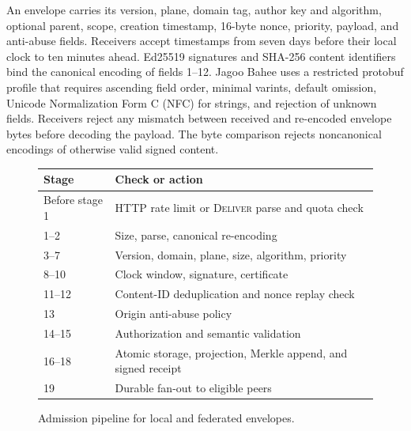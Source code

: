 \documentclass[conference,a4paper,10pt]{IEEEtran}
\begin{document}
An envelope carries its version, plane, domain tag, author key and algorithm, optional parent, scope, creation timestamp, 16-byte nonce, priority, payload, and anti-abuse fields. Receivers accept timestamps from seven days before their local clock to ten minutes ahead. Ed25519 signatures \cite{bernstein2012ed25519} and SHA-256 content identifiers bind the canonical encoding of fields 1--12. Jagoo Bahee uses a restricted protobuf profile \cite{protobufnotcanonical} that requires ascending field order, minimal varints, default omission, Unicode Normalization Form C (NFC) for strings, and rejection of unknown fields. Receivers reject any mismatch between received and re-encoded envelope bytes before decoding the payload. The byte comparison rejects noncanonical encodings of otherwise valid signed content.

\begin{figure}[!t]
  \centering
  {\footnotesize
  \begin{tabularx}{\columnwidth}{@{}lX@{}}
    \toprule
    \textbf{Stage} & \textbf{Check or action} \\
    \midrule
    Before stage 1 & HTTP rate limit or \textsc{Deliver} parse and quota check \\
    \midrule
    1--2 & Size, parse, canonical re-encoding \\
    3--7 & Version, domain, plane, size, algorithm, priority \\
    8--10 & Clock window, signature, certificate \\
    11--12 & Content-ID deduplication and nonce replay check \\
    \midrule
    13 & Origin anti-abuse policy \\
    14--15 & Authorization and semantic validation \\
    16--18 & Atomic storage, projection, Merkle append, and signed receipt \\
    19 & Durable fan-out to eligible peers \\
    \bottomrule
  \end{tabularx}}
  \caption{Admission pipeline for local and federated envelopes.}
  \label{fig:pipeline}
\end{figure}
\end{document}

